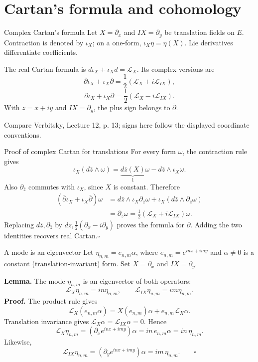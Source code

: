 \documentclass[aspectratio=169,11pt]{beamer}
\newcommand{\db}{\bar\partial}
\newcommand{\Lie}{\mathcal L}
\newcommand{\ee}{e_{n,m}}
\newcommand{\pbarz}{\partial_{\bar z}}
\newcommand{\src}[1]{\par\vfill{\scriptsize #1\par}}
\begin{document}
\section{Cartan's formula and cohomology}
\begin{frame}{Complex Cartan's formula}
Let $X=\partial_x$ and $IX=\partial_y$ be translation fields on $E$.
Contraction is denoted by $\iota_X$; on a one-form,
$\iota_X\eta=\eta(X)$. Lie derivatives differentiate coefficients.

The real Cartan formula is $d\iota_X+\iota_Xd=\Lie_X$.
Its complex versions are
\[
 \db\iota_X+\iota_X\db
 =\frac12(\Lie_X+i\Lie_{IX}),
\]
\[
 \partial\iota_X+\iota_X\partial
 =\frac12(\Lie_X-i\Lie_{IX}).
\]
With $z=x+iy$ and $IX=\partial_y$, the plus sign belongs to $\db$.
\src{Compare Verbitsky, Lecture 12, p. 13; signs here follow the displayed coordinate conventions.}
\end{frame}

\begin{frame}{Proof of complex Cartan for translations}
For every form $\omega$, the contraction rule gives
\[
 \iota_X(d\bar z\wedge\omega)
 =\underbrace{d\bar z(X)}_{1}\omega-d\bar z\wedge\iota_X\omega.
\]
Also $\pbarz$ commutes with $\iota_X$, since $X$ is constant. Therefore
\begin{align*}
 (\db\iota_X+\iota_X\db)\omega
 &=d\bar z\wedge\iota_X\pbarz\omega
   +\iota_X(d\bar z\wedge\pbarz\omega)\\
 &=\pbarz\omega
 =\tfrac12(\Lie_X+i\Lie_{IX})\omega.
\end{align*}
Replacing $d\bar z,\pbarz$ by $dz,\tfrac12(\partial_x-i\partial_y)$
proves the formula for $\partial$.
Adding the two identities recovers real Cartan.\hfill$\square$
\end{frame}

\begin{frame}{A mode is an eigenvector}
Let $\eta_{n,m}=\ee\alpha$, where $\ee=e^{inx+imy}$ and
$\alpha\ne0$ is a constant (translation-invariant) form.
Set $X=\partial_x$ and $IX=\partial_y$.

\textbf{Lemma.} The mode $\eta_{n,m}$ is an eigenvector of both operators:
\[
 \Lie_X\eta_{n,m}=in\eta_{n,m},\qquad
 \Lie_{IX}\eta_{n,m}=im\eta_{n,m}.
\]
\textbf{Proof.} The product rule gives
\[
 \Lie_X(\ee\alpha)
 =X(\ee)\alpha+\ee\Lie_X\alpha.
\]
Translation invariance gives $\Lie_X\alpha=\Lie_{IX}\alpha=0$. Hence
\[
 \Lie_X\eta_{n,m}
 =(\partial_x e^{inx+imy})\alpha
 =in\,\ee\alpha=in\,\eta_{n,m}.
\]
Likewise,
\[
 \Lie_{IX}\eta_{n,m}
 =(\partial_y e^{inx+imy})\alpha
 =im\,\eta_{n,m}.\qquad\square
\]
\end{frame}
\end{document}
